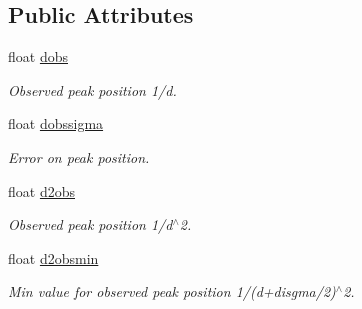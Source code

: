 \subsection*{Public Attributes}
\begin{DoxyCompactItemize}
\item 
\mbox{\label{struct_obj_cryst_1_1_peak_list_1_1hkl_a55f08e63e4fb2b1144a443ff9af6f417}} 
float \mbox{\hyperlink{struct_obj_cryst_1_1_peak_list_1_1hkl_a55f08e63e4fb2b1144a443ff9af6f417}{dobs}}
\begin{DoxyCompactList}\small\item\em Observed peak position 1/d. \end{DoxyCompactList}\item 
\mbox{\label{struct_obj_cryst_1_1_peak_list_1_1hkl_a8faeba0e940c91c2fcc26076eb4a3a9d}} 
float \mbox{\hyperlink{struct_obj_cryst_1_1_peak_list_1_1hkl_a8faeba0e940c91c2fcc26076eb4a3a9d}{dobssigma}}
\begin{DoxyCompactList}\small\item\em Error on peak position. \end{DoxyCompactList}\item 
\mbox{\label{struct_obj_cryst_1_1_peak_list_1_1hkl_ae3ff81cbc0c1ee35afb879446cf4069a}} 
float \mbox{\hyperlink{struct_obj_cryst_1_1_peak_list_1_1hkl_ae3ff81cbc0c1ee35afb879446cf4069a}{d2obs}}
\begin{DoxyCompactList}\small\item\em Observed peak position 1/d$^\wedge$2. \end{DoxyCompactList}\item 
\mbox{\label{struct_obj_cryst_1_1_peak_list_1_1hkl_a7bbdbab34e41397933140b0b0114389f}} 
float \mbox{\hyperlink{struct_obj_cryst_1_1_peak_list_1_1hkl_a7bbdbab34e41397933140b0b0114389f}{d2obsmin}}
\begin{DoxyCompactList}\small\item\em Min value for observed peak position 1/(d+disgma/2)$^\wedge$2. \end{DoxyCompactList}\item 
\mbox{\label{struct_obj_cryst_1_1_peak_list_1_1hkl_a437e9b76b38092c298b4f4aa64b45a9e}} 

\end{DoxyCompactItemize}
